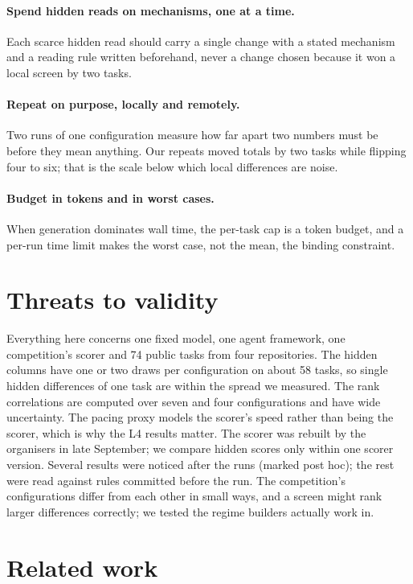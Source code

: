 \documentclass[11pt]{article}
\begin{document}
\paragraph{Spend hidden reads on mechanisms, one at a time.} Each scarce hidden read should carry a single change with a
stated mechanism and a reading rule written beforehand, never a change chosen because it won a local screen by two tasks.

\paragraph{Repeat on purpose, locally and remotely.} Two runs of one configuration measure how far apart two numbers must be
before they mean anything. Our repeats moved totals by two tasks while flipping four to six; that is the scale below which
local differences are noise.

\paragraph{Budget in tokens and in worst cases.} When generation dominates wall time, the per-task cap is a token budget,
and a per-run time limit makes the worst case, not the mean, the binding constraint.

\section{Threats to validity}
\label{sec:threats}

Everything here concerns one fixed model, one agent framework, one competition's scorer and 74 public tasks from four
repositories. The hidden columns have one or two draws per configuration on about 58 tasks, so single hidden differences of one
task are within the spread we measured. The rank correlations are computed over seven and four configurations and have wide
uncertainty. The pacing proxy models the scorer's speed rather than being the scorer, which is why the L4 results matter. The
scorer was rebuilt by the organisers in late September; we compare hidden scores only within one scorer version. Several
results were noticed after the runs (marked post hoc); the rest were read against rules committed before the run. The
competition's configurations differ from each other in small ways, and a screen might rank larger differences correctly;
we tested the regime builders actually work in.

\section{Related work}
\label{sec:related}
\end{document}
